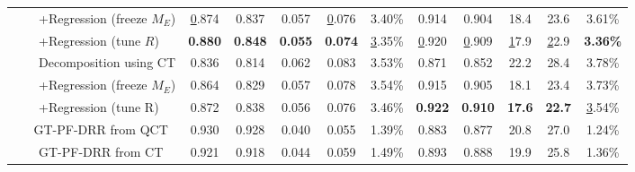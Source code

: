 \documentclass[times,twocolumn,final]{elsarticle}
\begin{document}
\begin{table}[!t]
\begin{adjustbox}{width=.95\textwidth}
\begin{tabular}{c|cl|ccccc|ccccc}
                                                                                                      & \multicolumn{1}{c|}{}                          & +Regression (freeze $M_E$) & {\ul 0.874}    & 0.837          & 0.057          & {\ul 0.076}    & 3.40\%             & 0.914          & 0.904          & 18.4           & 23.6               & 3.61\%          \\
                                                                                                      & \multicolumn{1}{c|}{}                          & +Regression (tune $R$)     & \textbf{0.880} & \textbf{0.848} & \textbf{0.055} & \textbf{0.074} & {\ul 3.35\%}             & {\ul 0.920}    & {\ul 0.909}    & {\ul 17.9}     & {\ul 22.9}     & \textbf{3.36\%}     \\ \cline{3-3}
                                                                                                      & \multicolumn{1}{c|}{}                          & Decomposition using CT     & 0.836          & 0.814          & 0.062          & 0.083          & 3.53\%                 & 0.871          & 0.852          & 22.2           & 28.4           & 3.78\%              \\
                                                                                                      & \multicolumn{1}{c|}{}                          & +Regression (freeze $M_E$) & 0.864          & 0.829          & 0.057          & 0.078          & 3.54\%                 & 0.915          & 0.905          & 18.1           & 23.4           & 3.73\%             \\
                                                                                                      & \multicolumn{1}{c|}{}                          & +Regression (tune R)       & 0.872          & 0.838          & 0.056          & 0.076          & 3.46\%                 & \textbf{0.922} & \textbf{0.910} & \textbf{17.6}  & \textbf{22.7}  & {\ul 3.54\%}          \\ \cline{2-13} 
                                                                                                      & \multicolumn{2}{c|}{GT-PF-DRR from QCT}                                     & 0.930          & 0.928          & 0.040          & 0.055          & 1.39\%                 & 0.883          & 0.877          & 20.8           & 27.0           & 1.24\%              \\
                                                                                                      & \multicolumn{2}{c|}{GT-PF-DRR from CT}                                      & 0.921          & 0.918          & 0.044          & 0.059          & 1.49\%                 & 0.893          & 0.888          & 19.9           & 25.8           & 1.36\%              \\ \hline

\end{tabular}
\end{adjustbox}
\end{table}
\end{document}
